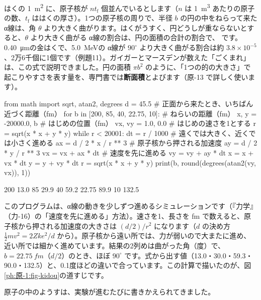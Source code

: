 はくの \qty{1}{m^2} に、原子核が $nt_{\mathrm f}$ 個並んでいるとします（$n$ は \qty{1}{m^3} あたりの原子の数、$t_{\mathrm f}$ ははくの厚さ）。1つの原子核の周りで、半径 $b$ の円の中をねらって来た α線は、角 $\theta$ より大きく曲がります。はくがうすく、円どうしが重ならないとすると、$\theta$ より大きく曲がる α線の割合は、円の面積の合計の割合で、
です。\qty{0.40}{\micro m}の金はくで、\qty{5.0}{MeV}の α線が $90^\circ$ より大きく曲がる割合は約 $3.8\times10^{-5}$、2万6千個に1個です（例題11）。ガイガーとマースデンが数えた「ごくまれ」は、この式で説明できました。円の面積 $\pi b^2$ のように、「1つの的の大きさ」で起こりやすさを表す量を、専門書では\textbf{断面積}とよびます（原-13 で詳しく使います）。

\begin{phcode}[Python]
from math import sqrt, atan2, degrees
d = 45.5                  \# 正面から来たとき、いちばん近づく距離（fm）
for b in [200, 85, 40, 22.75, 10]:   \# ねらいの距離（fm）
    x, y = -20000.0, b    \# はじめの位置（fm）
    vx, vy = 1.0, 0.0     \# はじめの速さを1とする
    r = sqrt(x * x + y * y)
    while r < 20001:
        dt = r / 1000     \# 遠くでは大きく、近くでは小さく進める
        ax = d / 2 * x / r ** 3   \# 原子核から押される加速度
        ay = d / 2 * y / r ** 3
        vx = vx + ax * dt \# 速度を先に進める
        vy = vy + ay * dt
        x = x + vx * dt
        y = y + vy * dt
        r = sqrt(x * x + y * y)
    print(b, round(degrees(atan2(vy, vx)), 1))
\end{phcode}
\begin{phcodeout}[実行結果]
200 13.0
85 29.9
40 59.2
22.75 89.9
10 132.5
\end{phcodeout}
\noindent このプログラムは、α線の動きを少しずつ進めるシミュレーションです（『力学』（力-16）の「速度を先に進める」方法）。速さを1、長さを fm で数えると、原子核から押される加速度の大きさは $(d/2)/r^2$ になります（$d$ の決め方 $\tfrac12mv^2=2Zke^2/d$ から）。原子核から遠い所では、力が弱いので大またに進め、近い所では細かく進めています。結果の2列めは曲がった角（度）で、$b=\qty{22.75}{fm}$（$d/2$）のとき、ほぼ $90^\circ$ です。式から出す値（13.0・30.0・59.3・90.0・132.5）と、0.1度ほどの違いで合っています。この計算で描いたのが、図\ref{ph:原-1:fig-kidou}の道すじです。

\label{ph:原-1:sec9}
原子の中のようすは、実験が進むたびに書きかえられてきました。

